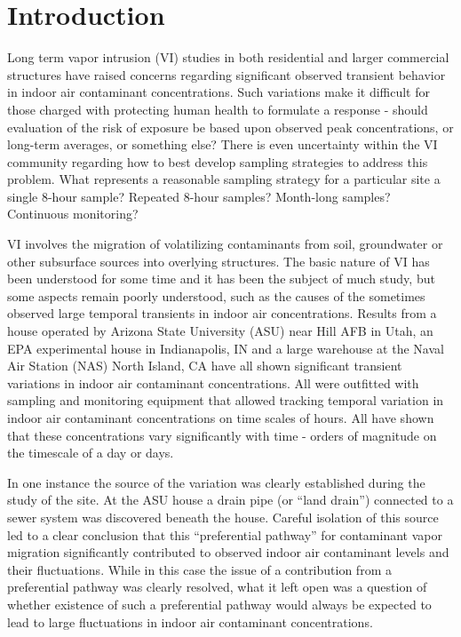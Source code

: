 \documentclass[preprint,12pt]{elsarticle}
\begin{document}
\section{Introduction}\label{s:intro}

Long term vapor intrusion (VI) studies in both residential and larger commercial structures have raised concerns regarding significant observed transient behavior in indoor air contaminant concentrations\cite{u.s._environmental_protection_agency_oswer_2015,folkes_observed_2009,holton_temporal_2013,johnston_spatiotemporal_2014,hosangadi_high-frequency_2017,mchugh_recent_2017,u.s._environmental_protection_agency_assessment_2015}.
Such variations make it difficult for those charged with protecting human health to formulate a response - should evaluation of the risk of exposure be based upon observed peak concentrations, or long-term averages, or something else?
There is even uncertainty within the VI community regarding how to best develop sampling strategies to address this problem\cite{u.s._environmental_protection_agency_oswer_2015,holton_temporal_2013,johnson_integrated_2016}.
What represents a reasonable sampling strategy for a particular site a single 8-hour sample?
Repeated 8-hour samples?
Month-long samples?
Continuous monitoring?\par

VI involves the migration of volatilizing contaminants from soil, groundwater or other subsurface sources into overlying structures.
The basic nature of VI has been understood for some time and it has been the subject of much study, but some aspects remain poorly understood, such as the causes of the sometimes observed large temporal transients in indoor air concentrations.
Results from a house operated by Arizona State University (ASU) near Hill AFB in Utah, an EPA experimental house in Indianapolis, IN and a large warehouse at the Naval Air Station (NAS) North Island, CA have all shown significant transient variations in indoor air contaminant concentrations.
All were outfitted with sampling and monitoring equipment that allowed tracking temporal variation in indoor air contaminant concentrations on time scales of hours.
All have shown that these concentrations vary significantly with time - orders of magnitude on the timescale of a day or days\cite{holton_evaluation_2015,guo_vapor_2015,hosangadi_high-frequency_2017}.\par

In one instance the source of the variation was clearly established during the study of the site.
At the ASU house a drain pipe (or “land drain”) connected to a sewer system was discovered beneath the house.
Careful isolation of this source led to a clear conclusion that this “preferential pathway” for contaminant vapor migration significantly contributed to observed indoor air contaminant levels and their fluctuations\cite{guo_vapor_2015,guo_identification_2015}.
While in this case the issue of a contribution from a preferential pathway was clearly resolved, what it left open was a question of whether existence of such a preferential pathway would always be expected to lead to large fluctuations in indoor air contaminant concentrations.\par
\end{document}

